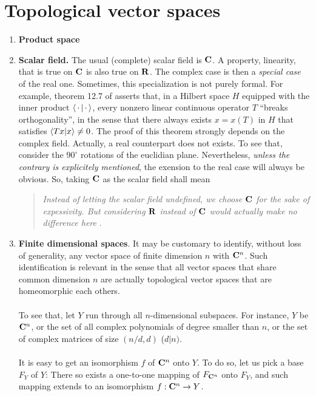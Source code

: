 \section*{Topological vector spaces}
\begin{enumerate}
\item{{\bf Product space}}
\item {\bf Scalar field.} The usual (complete) scalar field is ${\mathbf C}$. %
A property, \eg linearity, that is true on ${\mathbf C}$ is also true on ${\mathbf R}$. %
The complex case is then a {\it special case} of the real one. %
Sometimes, this specialization is not purely formal. %
For example, theorem 12.7 of \cite{FA} asserts that, in a Hilbert space $H$ %
equipped with the inner product $\bra{\,\cdot\,}\ket{\,\cdot\,}$, %
every nonzero linear continuous operator $T$ ``breaks orthogonality'', %
in the sense that there always exists $x=x(T)$ in $H$ that satisfies %
%
  $\bra{Tx}\ket{x} \neq 0$. %
%
The proof of this theorem strongly depends on the complex field. %
Actually, a real counterpart does not exists. %
To see that, consider the $90^\circ$ rotations of the euclidian plane. %
%
Nevertheless, {\it unless the contrary is explicitely mentioned}, %
the exension to the real case will always be obvious. %
So, taking ${\mathbf C}$ as the scalar field shall mean %
%
\begin{quote}{\it %
Instead of letting the scalar field undefined, we choose ${\mathbf C}$ for the sake of %
expessivity. But considering ${\mathbf R}$ instead of %
${\mathbf C}$ would actually make no difference here
}. %
\end{quote}
%
\item {\bf Finite dimensional spaces}. %
It may be customary to identify, without loss of generality, %
any vector space of finite dimension $n$ with ${\mathbf C}^n$. %
%
Such identification is relevant in the sense that all vector spaces that %
share common dimension $n$ are actually topological vector spaces that are %
homeomorphic each others. \\
\\
To see that, let $\mathit{Y}$ run through all $n$-dimensional subspaces. 
For instance, $Y$ be ${\mathbf C}^n$, %
or the set of all complex %
polynomials of degree smaller than $n$, %
or the set of complex matrices of size $(n/d, d)$ ($d |n)$. \\
\\
It is easy to get an isomorphism $f$ of ${\mathbf C}^n$ onto $Y$. %
To do so, let us pick a base $F_Y$ of $Y$: %
There so exists a one-to-one mapping of $F_{{\mathbf C}^n}$ onto $ F_Y$, %
and such mapping extends to an isomorphism $f: {\mathbf C}^n \to Y$. \\

\end{enumerate}
